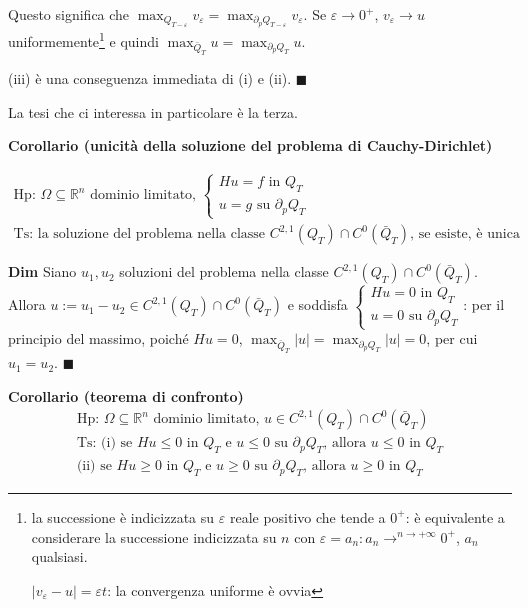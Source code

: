 \documentclass{article}
\begin{document}
Questo significa che $\max_{Q_{T-\varepsilon }}v_{\varepsilon
}=\max_{\partial _{p}Q_{T-\varepsilon }}v_{\varepsilon }$. Se $\varepsilon
\rightarrow 0^{+}$, $v_{\varepsilon }\rightarrow u$ uniformemente\footnote{%
la successione \`{e} indicizzata su $\varepsilon $ reale positivo che tende
a $0^{+}$: \`{e} equivalente a considerare la successione indicizzata su $n$
con $\varepsilon =a_{n}:a_{n}\rightarrow ^{n\rightarrow +\infty }0^{+}$, $%
a_{n}$ qualsiasi.
\par
$\left\vert v_{\varepsilon }-u\right\vert =\varepsilon t$: la convergenza
uniforme \`{e} ovvia} e quindi $\max_{\bar{Q}_{T}}u=\max_{\partial
_{p}Q_{T}}u$.

(iii) \`{e} una conseguenza immediata di (i) e (ii). $\blacksquare $

La tesi che ci interessa in particolare \`{e} la terza.

\textbf{Corollario (unicit\`{a} della soluzione del problema di
Cauchy-Dirichlet)}

\begin{gather*}
\text{Hp: }\Omega \subseteq 
\mathbb{R}
^{n}\text{ dominio limitato, }\left\{ 
\begin{array}{c}
Hu=f\text{ in }Q_{T} \\ 
u=g\text{ su }\partial _{p}Q_{T}%
\end{array}%
\right. \\
\text{Ts: la soluzione del problema nella classe }C^{2,1}\left( Q_{T}\right)
\cap C^{0}\left( \bar{Q}_{T}\right) \text{, se esiste, \`{e} unica}
\end{gather*}

\textbf{Dim} Siano $u_{1},u_{2}$ soluzioni del problema nella classe $%
C^{2,1}\left( Q_{T}\right) \cap C^{0}\left( \bar{Q}_{T}\right) $. Allora $%
u:=u_{1}-u_{2}\in C^{2,1}\left( Q_{T}\right) \cap C^{0}\left( \bar{Q}%
_{T}\right) $ e soddisfa $\left\{ 
\begin{array}{c}
Hu=0\text{ in }Q_{T} \\ 
u=0\text{ su }\partial _{p}Q_{T}%
\end{array}%
\right. $: per il principio del massimo, poich\'{e} $Hu=0$, $\max_{\bar{Q}%
_{T}}\left\vert u\right\vert =\max_{\partial _{p}Q_{T}}\left\vert
u\right\vert =0$, per cui $u_{1}=u_{2}$. $\mathbf{\blacksquare }$

\textbf{Corollario (teorema di confronto)}%
\begin{gather*}
\text{Hp: }\Omega \subseteq 
\mathbb{R}
^{n}\text{ dominio limitato, }u\in C^{2,1}\left( Q_{T}\right) \cap
C^{0}\left( \bar{Q}_{T}\right) \\
\text{Ts: (i) se }Hu\leq 0\text{ in }Q_{T}\text{ e }u\leq 0\text{ su }%
\partial _{p}Q_{T}\text{, allora }u\leq 0\text{ in }Q_{T} \\
\text{(ii) se }Hu\geq 0\text{ in }Q_{T}\text{ e }u\geq 0\text{ su }\partial
_{p}Q_{T}\text{, allora }u\geq 0\text{ in }Q_{T}
\end{gather*}
\end{document}
